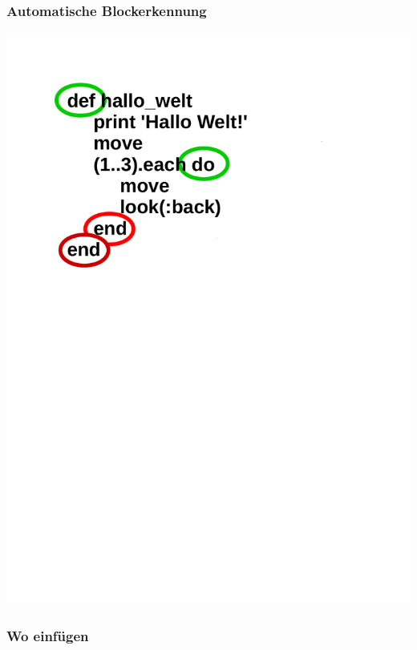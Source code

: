 \begin{frame}
	\frametitle{Automatische Blockerkennung}
	\begin{center}
		\includegraphics[scale=0.4]{scopes/beispiel2.pdf}
	\end{center}
\end{frame}

\begin{frame}
	\frametitle{Wo einfügen}
	\inputminted[linenos, frame=lines, label=Beispiel 1]{ruby}{scopes/beispiel1.rb}
\end{frame}

